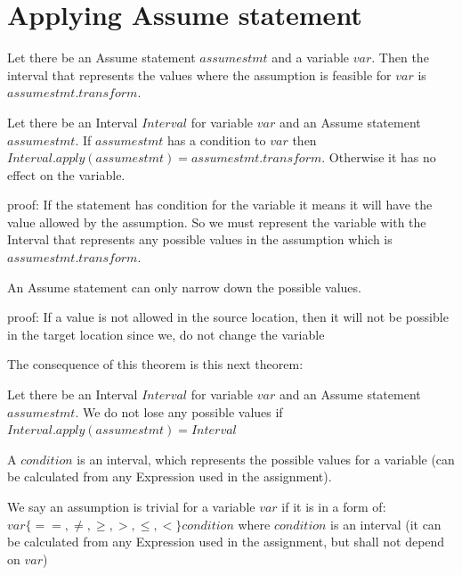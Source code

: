 \section{Applying Assume statement}

\begin{definition}
	Let there be an Assume statement $assumestmt$ and a variable $var$. Then the interval that represents the values where the assumption is feasible for $var$ is $assumestmt.transform$.
\end{definition}

\begin{theorem}
	Let there be an Interval $Interval$ for variable $var$ and an Assume statement $assumestmt$. If $assumestmt$ has a condition to $var$ then
	$Interval.apply(assumestmt)=assumestmt.transform$. Otherwise it has no effect on the variable.
\end{theorem}
{proof: } If the statement has condition for the variable it means it will have the value allowed by the assumption. So we must represent the variable with the Interval that represents any possible values in the assumption which is $assumestmt.transform$.

\begin{theorem}
	An Assume statement can only narrow down the possible values.
\end{theorem} 
{proof: } If a value is not allowed in the source location, then it will not be possible in the target location since we, do not change the variable

The consequence of this theorem is this next theorem:
\begin{theorem}
	Let there be an Interval $Interval$ for variable $var$ and an Assume statement $assumestmt$. We do not lose any possible values if $Interval.apply(assumestmt)=Interval$
\end{theorem} 

\begin{definition}
	A $condition$ is an interval, which represents the possible values for a variable (can be calculated from any Expression used in the assignment).
\end{definition}

\begin{definition}
	We say an assumption is trivial for a variable $var$ if it is in a form of: $var \{==, \neq, \geq, >, \leq, < \} condition$ where $condition$ is an interval (it can be calculated from any Expression used in the assignment, but shall not depend on $var$)
\end{definition}

